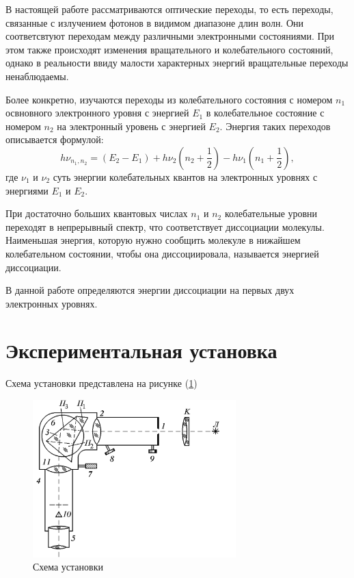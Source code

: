 \documentclass[a4paper, 12pt]{article}
\begin{document}
В настоящей работе рассматриваются оптические переходы, то есть переходы, связанные с излучением фотонов в видимом диапазоне длин волн. Они соответсвтуют переходам между различными электронными состояниями. При этом также происходят изменения вращательного и колебательного состояний, однако в реальности ввиду малости характерных энергий вращательные переходы ненаблюдаемы.

Более конкретно, изучаются переходы из колебательного состояния с номером $n_1$ освновного электронного уровня с энергией $E_1$ в колебательное состояние с номером $n_2$ на электронный уровень с энергией $E_2$. Энергия таких переходов описывается формулой:
\begin{equation}
	h \nu_{n_1,n_2}=(E_2-E_1)+h\nu_2(n_2+\dfrac{1}{2})-h \nu_1(n_1+\dfrac{1}{2}),
\end{equation}
где $\nu_1$ и $\nu_2$ суть энергии колебательных квантов на электронных уровнях с энергиями $E_1$ и $E_2$.

При достаточно больших квантовых числах $n_1$ и $n_2$ колебательные уровни переходят в непрерывный спектр, что соответствует диссоциации молекулы. Наименьшая энергия, которую нужно сообщить молекуле в нижайшем колебательном состоянии, чтобы она диссоциировала, называется энергией диссоциации.

В данной работе определяются энергии диссоциации на первых двух электронных уровнях.


\section{Экспериментальная установка}
Схема установки представлена на рисунке (\ref{fig:set})

\begin{figure}[H]
    \centering
    \includegraphics[width=0.7\textwidth]{set.png}
    \caption{Схема установки}
    \label{fig:set}
\end{figure}
\end{document}
